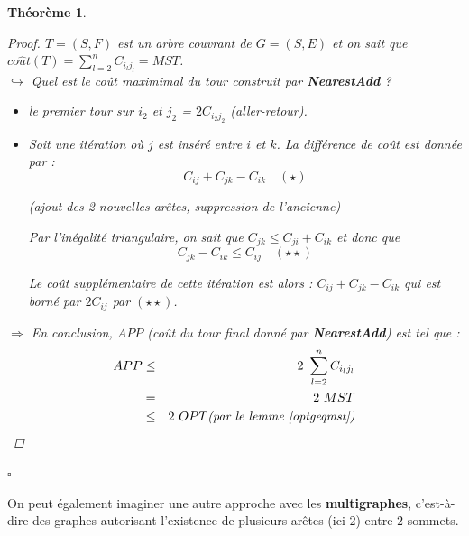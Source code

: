 \documentclass{article}
\newcommand{\cqfd}{\begin{flushright}$\square$\end{flushright}}
\newtheorem{thm}{Th\'eor\`eme}[section]
\newtheorem{proof}{Preuve}[section]
\begin{document}
\begin{sffamily}
\begin{thm}
\begin{proof}
\noindent $T = (S,F)$ est un arbre couvrant de $G=(S,E)$ et on sait que $co\hat{u}t(T) = \sum_{l=2}^n C_{i_lj_l} = MST$.\\
$\hookrightarrow$ Quel est le coût maximimal du tour construit par \textbf{NearestAdd} ?
\begin{itemize}
\item[$\rightarrow$] le premier tour sur $i_2$ et $j_2$ = $2C_{i_2j_2}$ (aller-retour).
\item[$\rightarrow$] Soit une itération où $j$ est inséré entre $i$ et $k$. La différence de coût est donnée par :
$$C_{ij}+C_{jk}-C_{ik}\quad (\star )$$
\begin{center}\textit{(ajout des 2 nouvelles arêtes, suppression de l'ancienne)}\end{center}
Par l'inégalité triangulaire, on sait que $C_{jk}\leq C_{ji} + C_{ik}$ et donc que
$$C_{jk}-C_{ik} \leq C_{ij}\quad (\star\star )$$

Le coût supplémentaire de cette itération est alors : $C_{ij}+C_{jk}-C_{ik}$ qui est borné par $2C_{ij}$ par $(\star\star )$. \\
\end{itemize}

\noindent $\Rightarrow$ En conclusion, $APP$ (coût du tour final donné par \textbf{NearestAdd}) est tel que :
\begin{eqnarray}
\nonumber APP &\leq& 2\ \sum_{l=2}^n C_{i_lj_l} \\
\nonumber     & =  & 2\ MST \\
\nonumber     & \leq & 2\ OPT \text{\textit{(par le lemme \ref{optgeqmst})}}
\end{eqnarray}
\end{proof}
\cqfd
\end{thm}

On peut également imaginer une autre approche avec les \textbf{multigraphes}, c'est-à-dire des graphes autorisant l'existence de plusieurs
arêtes (ici $2$) entre $2$ sommets.


\end{sffamily}
\end{document}
